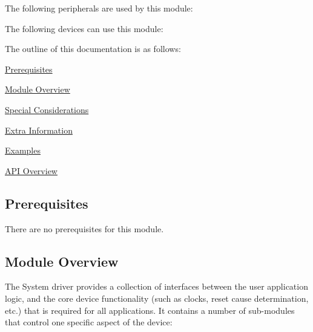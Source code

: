 The following peripherals are used by this module\+:

The following devices can use this module\+:

The outline of this documentation is as follows\+:
\begin{DoxyItemize}
\item \hyperlink{group__asfdoc__sam0__system__group_asfdoc_sam0_system_prerequisites}{Prerequisites}
\item \hyperlink{group__asfdoc__sam0__system__group_asfdoc_sam0_system_module_overview}{Module Overview}
\item \hyperlink{group__asfdoc__sam0__system__group_asfdoc_sam0_system_special_considerations}{Special Considerations}
\item \hyperlink{group__asfdoc__sam0__system__group_asfdoc_sam0_system_extra_info}{Extra Information}
\item \hyperlink{group__asfdoc__sam0__system__group_asfdoc_sam0_system_examples}{Examples}
\item \hyperlink{group__asfdoc__sam0__system__group_asfdoc_sam0_system_api_overview}{A\+P\+I Overview}
\end{DoxyItemize}\hypertarget{group__asfdoc__sam0__system__group_asfdoc_sam0_system_prerequisites}{}\subsection{Prerequisites}\label{group__asfdoc__sam0__system__group_asfdoc_sam0_system_prerequisites}
There are no prerequisites for this module.\hypertarget{group__asfdoc__sam0__system__group_asfdoc_sam0_system_module_overview}{}\subsection{Module Overview}\label{group__asfdoc__sam0__system__group_asfdoc_sam0_system_module_overview}
The System driver provides a collection of interfaces between the user application logic, and the core device functionality (such as clocks, reset cause determination, etc.) that is required for all applications. It contains a number of sub-\/modules that control one specific aspect of the device\+:


